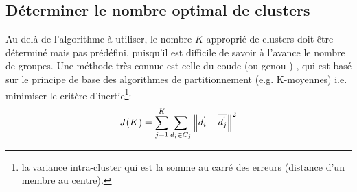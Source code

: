 


\subsection{Déterminer le nombre optimal de clusters}


 Au delà de l’algorithme à utiliser, le nombre $K$ approprié de clusters doit être déterminé mais pas prédéfini, puisqu'il est difficile de savoir à l'avance le nombre de groupes. Une méthode très connue est celle du \og coude \fg{}  (ou \og genou \fg{}) \citep{halkidi2001clustvalidation}, qui est basé sur le principe de base des algorithmes de partitionnement (e.g. K-moyennes) i.e. minimiser le critère d'inertie\footnote{la variance intra-cluster qui est la somme au carré des erreurs (distance d'un membre au centre).}:
\[J(K) = \sum\limits_{j=1}^K\sum\limits_{d_i \in C_j}\left\lVert\vec{d}_i-\overline{\vec{d}_j}\right\rVert^2\]

